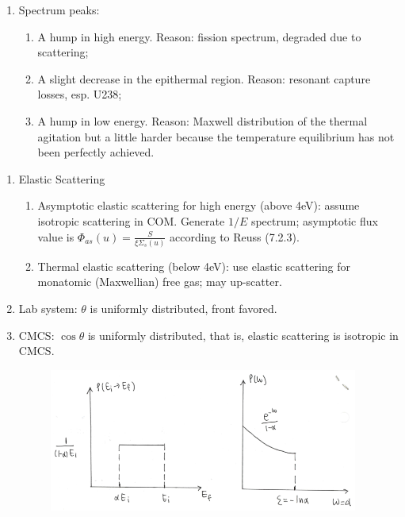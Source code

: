 \documentclass{school-22.211-notes}
\begin{document}
\begin{enumerate}
\item Spectrum peaks:   
  \begin{enumerate}
  \item A hump in high energy. Reason: fission spectrum, degraded due to scattering; 
  \item A slight decrease in the epithermal region. Reason: resonant capture losses, esp. U238; 
  \item A hump in low energy. Reason: Maxwell distribution of the thermal agitation but a little harder because the temperature equilibrium has not been perfectly achieved. 
  \end{enumerate}
\end{enumerate}


\clearpage
{} 
\begin{enumerate}
\item Elastic Scattering
  \begin{enumerate}
  \item Asymptotic elastic scattering for high energy (above 4eV): assume isotropic scattering in COM. Generate $1/E$ spectrum; asymptotic flux value is $\Phi_{as} (u) = \frac{S}{\xi \Sigma_s (u)}$ according to Reuss (7.2.3). 
  \item Thermal elastic scattering (below 4eV): use elastic scattering for monatomic (Maxwellian) free gas; may up-scatter. 
  \end{enumerate}

\item Lab system: $\theta$ is uniformly distributed, front favored. 

\item CMCS: $\cos \theta$ is uniformly distributed, that is, elastic scattering is isotropic in CMCS. 
  \begin{figure}[ht]
    \centering
    \includegraphics[width=4in]{images/sl-d/prob.png}
  \end{figure}



\end{enumerate}
\end{document}
